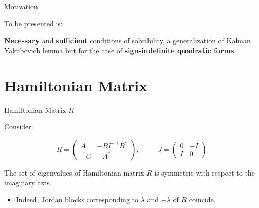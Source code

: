     
\begin{frame}{Motivation}


\begin{block}{\Large To be presented is:}

 {\Large \underline{\bf Necessary} and \underline{\bf sufficient} conditions of solvability, a generalization 
of Kalman Yakubovich lemma but for the case of \underline{\bf sign-indefinite quadratic forms}}.

\end{block}



\end{frame}     

%
%
\section{Hamiltonian Matrix}


\begin{frame}{Hamiltonian Matrix $R$}

\begin{block}{Consider:}

\begin{equation*}
R = \left(\begin{array}{cc}
A&-B\Gamma ^{-1}B^{*} \\
 -G&-A^{*}\end{array}\right) , \; \; \qquad J = \left(\begin{array}{cc}
0&-I \\
 I&0\end{array}\right)
\end{equation*}

\end{block}
 

The set of eigenvalues of Hamiltonian matrix $R$ is symmetric with respect to the imaginary axis. 

\begin{itemize}
\item Indeed, Jordan blocks corresponding to $\lambda$ and $-\bar\lambda$ of $R$ coincide. 
\end{itemize}



\end{frame}

